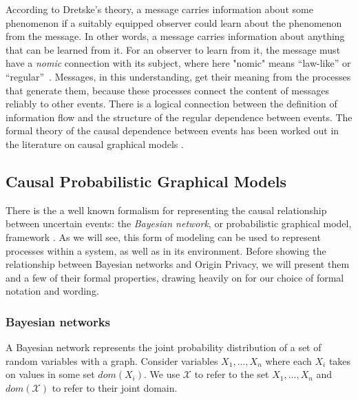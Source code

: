 \documentclass[../thesis.tex]{subfiles}
\begin{document}
According to Dretske's theory, a message
carries information about some phenomenon if a suitably equipped
observer could learn about the phenomenon from the message.
In other words, a message carries information about anything that
can be learned from it.
For an observer to learn from it, the message must have
a \emph{nomic} connection with its subject, where here "nomic" means
``law-like'' or ``regular''~\cite{dretske1981knowledge}.
Messages, in this understanding, get their meaning from the
processes that generate them, because these processes connect
the content of messages reliably to other events.
There is a logical connection between the definition of information
flow and the structure of the regular dependence between events.
The formal theory of the causal dependence between events has been
worked out in the literature on causal graphical 
models \cite{pearl1988probabilistic}.

\subsection{Causal Probabilistic Graphical Models}
\label{sec:orgheadline18}

There is the a well known formalism for representing
the causal relationship between uncertain events: the
\emph{Bayesian network}, or probabilistic 
graphical model, framework \cite{pearl1988probabilistic}. 
As we will see, this form of modeling can be used to represent
processes within a system, as well as in its environment.
Before showing the relationship between Bayesian networks
and Origin Privacy, we will present them and a few of their
formal properties, drawing heavily on \citet{koller2003multi}
for our choice of formal notation and wording.

\subsubsection{Bayesian networks}
\label{sec:orgheadline16}

A Bayesian network represents the joint probability distribution
of a set of random variables with a graph. Consider variables
\(X_1, ..., X_n\) where each \(X_i\) takes on values in some set
\(dom(X_i)\). We use \(\mathcal{X}\) to refer to the set \(X_1, ..., X_n\)
and \(dom(\mathcal{X})\) to refer to their joint domain.
\end{document}
